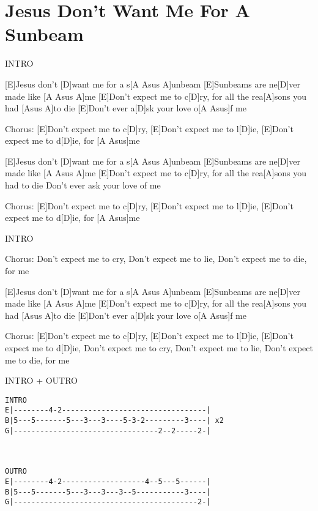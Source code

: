 \section{Jesus Don't Want Me For A Sunbeam}
\begin{multicols}{2}
\begin{guitar}
INTRO


[E]Jesus don't [D]want me for a s[A Asus A]unbeam 
[E]Sunbeams are ne[D]ver made like [A Asus A]me 
[E]Don't expect me to c[D]ry, for all the rea[A]sons 
you had [Asus A]to die 
[E]Don't ever a[D]sk your love o[A Asus]f me


Chorus:
[E]Don't expect me to c[D]ry, 
[E]Don't expect me to l[D]ie, 
[E]Don't expect me to d[D]ie, 
for [A Asus]me 


[E]Jesus don't [D]want me for a s[A Asus A]unbeam 
[E]Sunbeams are ne[D]ver made like [A Asus A]me 
[E]Don't expect me to c[D]ry, for all the rea[A]sons 
you had to die 
Don't ever ask your love of me


Chorus:
[E]Don't expect me to c[D]ry, 
[E]Don't expect me to l[D]ie, 
[E]Don't expect me to d[D]ie, 
for [A Asus]me 


INTRO

Chorus:
Don't expect me to cry, 
Don't expect me to lie, 
Don't expect me to die, 
for me 


[E]Jesus don't [D]want me for a s[A Asus A]unbeam 
[E]Sunbeams are ne[D]ver made like [A Asus A]me 
[E]Don't expect me to c[D]ry, for all the rea[A]sons 
you had [Asus A]to die 
[E]Don't ever a[D]sk your love o[A Asus]f me


Chorus:
[E]Don't expect me to c[D]ry, 
[E]Don't expect me to l[D]ie, 
[E]Don't expect me to d[D]ie, 
Don't expect me to cry, 
Don't expect me to lie, 
Don't expect me to die, 
for me 


INTRO + OUTRO
\begin{verbatim}
INTRO
E|--------4-2---------------------------------|
B|5---5-------5---3---3----5-3-2---------3----| x2
G|---------------------------------2--2-----2-|



OUTRO
E|--------4-2-------------------4--5---5------|
B|5---5-------5---3---3---3--5-----------3----| 
G|------------------------------------------2-|




\end{verbatim}

\end{guitar}
\end{multicols}
